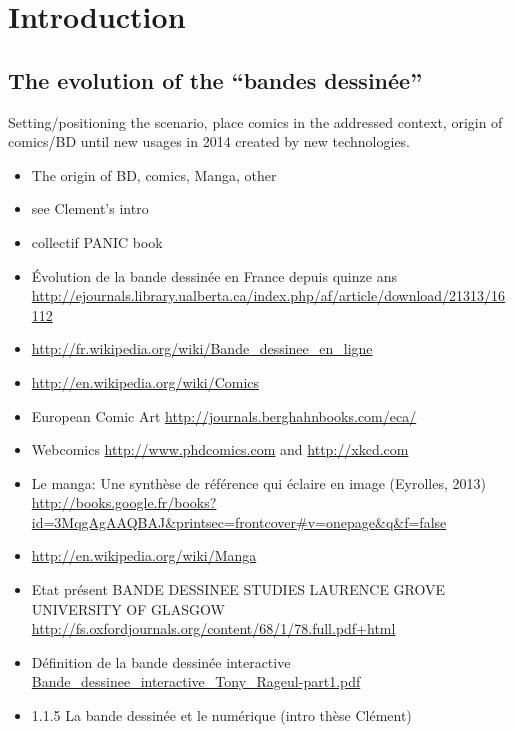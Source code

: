 \chapter{Introduction}%
\label{chap:intro}
\graphicspath{{./chapters/1-introduction/figs/}}
\section{The evolution of the ``bandes dessinée''}
Setting/positioning the scenario, place comics in the addressed context, origin of comics/BD until new usages in 2014 created by new technologies.
\cite[p.~215]{McCloud94}

\begin{itemize}
	\item The origin of BD, comics, Manga, other

	\item see Clement's intro
	\item collectif PANIC book
	\item Évolution de la bande dessinée en France depuis quinze ans \url{http://ejournals.library.ualberta.ca/index.php/af/article/download/21313/16112}
	\item \url{http://fr.wikipedia.org/wiki/Bande_dessinee_en_ligne}

	\item \url{http://en.wikipedia.org/wiki/Comics}
	\item European Comic Art \url{http://journals.berghahnbooks.com/eca/}
	\item Webcomics \url{http://www.phdcomics.com} and \url{http://xkcd.com}
	\item Le manga: Une synthèse de référence qui éclaire en image (Eyrolles, 2013) \url{http://books.google.fr/books?id=3MqgAgAAQBAJ&printsec=frontcover#v=onepage&q&f=false}
	\item \url{http://en.wikipedia.org/wiki/Manga}
	\item Etat présent BANDE DESSINEE STUDIES LAURENCE GROVE UNIVERSITY OF GLASGOW \url{http://fs.oxfordjournals.org/content/68/1/78.full.pdf+html}
	\item Définition de la bande dessinée interactive \url{Bande_dessinee_interactive_Tony_Rageul-part1.pdf}
	\item 1.1.5 La bande dessinée et le numérique (intro thèse Clément)


\end{itemize}
